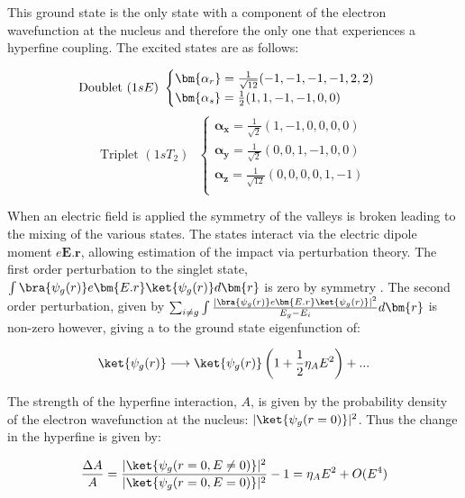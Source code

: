 This ground state is the only state with a component of the electron wavefunction at the nucleus and therefore the only one that experiences a hyperfine coupling.
The excited states are as follows:

\begin{equation}
\text{Doublet  } (1sE) \text{  }
\begin{cases}
\bm{\alpha_r} = \frac{1}{\sqrt{12}}(-1, -1, -1, -1, 2, 2)\\
\bm{\alpha_s} = \frac{1}{2}(1, 1, -1, -1, 0, 0)\\
\end{cases}\\
\end{equation}
\begin{equation}
\text{Triplet  } (1sT_2) \text{  }
\begin{cases}
\bm{\alpha_x} = \frac{1}{\sqrt{2}}(1, -1, 0, 0, 0, 0)\\
\bm{\alpha_y} = \frac{1}{\sqrt{2}}(0, 0, 1, -1, 0, 0)\\
\bm{\alpha_z} = \frac{1}{\sqrt{12}}(0, 0, 0, 0, 1, -1)\\
\end{cases}
\end{equation}

When an electric field is applied the symmetry of the valleys is broken leading to the mixing of the various states.
The states interact via the electric dipole moment $e\bm{E.r}$, allowing estimation of the impact via perturbation theory.
The first order perturbation to the singlet state, $\int\bra{\psi_g(r)}e\bm{E.r}\ket{\psi_g(r)}d\bm{r}$ is zero by symmetry \cite{Pica2014}.
The second order perturbation, given by $\sum_{i\neq g}{\int\frac{|\bra{\psi_g(r)}e\bm{E.r}\ket{\psi_g(r)}|^2}{E_g - E_i}d\bm{r}}$ is non-zero however, giving a to the ground state eigenfunction of:

\begin{equation}
\ket{\psi_g(r)} \longrightarrow \ket{\psi_g(r)}\left(1 + \frac{1}{2}\eta_A E^2 \right)+...
\end{equation}

The strength of the hyperfine interaction, $A$, is given by the probability density of the electron wavefunction at the nucleus: $|\ket{\psi_g(r=0)}|^2$.
Thus the change in the hyperfine is given by:

\begin{equation}
\frac{\Delta A}{A} = \frac{|\ket{\psi_g(r=0, E\neq 0)}|^2}{|\ket{\psi_g(r=0, E = 0)}|^2} - 1 = \eta_AE^2 + O(E^4)
\end{equation}

